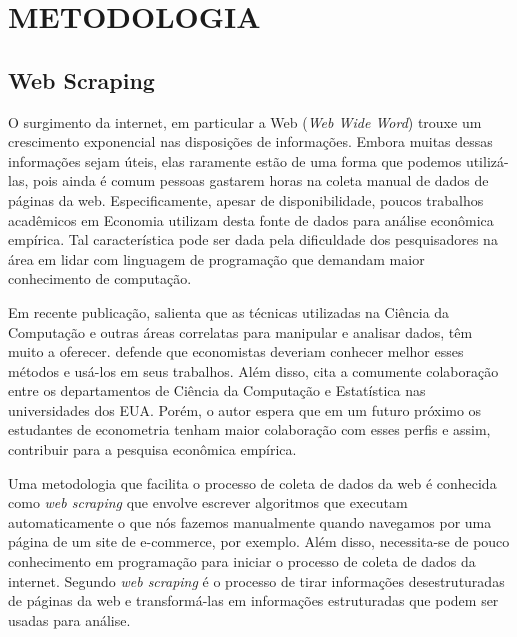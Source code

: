 \pagestyle{empty}
\cleardoublepage
\pagestyle{fancy}

\section{METODOLOGIA}

\subsection{Web Scraping}

O surgimento da internet, em particular a Web (\emph{Web Wide Word}) trouxe um crescimento exponencial nas disposições de informações. Embora muitas dessas informações sejam úteis, elas raramente estão de uma forma que podemos utilizá-las, pois ainda é comum pessoas gastarem horas na coleta manual de dados de páginas da web. Especificamente, apesar de disponibilidade, poucos trabalhos acadêmicos em Economia utilizam desta fonte de dados para análise econômica empírica. Tal característica pode ser dada pela dificuldade dos pesquisadores na área em lidar com linguagem de programação que demandam maior conhecimento de computação. 

Em recente publicação, \citet{varian2014big} salienta que as técnicas utilizadas na Ciência da Computação e outras áreas correlatas para manipular e analisar dados, têm muito a oferecer. \citet{varian2014big} defende que economistas deveriam conhecer melhor esses métodos e usá-los em seus trabalhos. Além disso, \citet{varian2014big} cita a comumente colaboração entre os departamentos de Ciência da Computação e Estatística nas universidades dos EUA. Porém, o autor espera que em um futuro próximo os estudantes de econometria tenham maior colaboração com esses perfis e assim, contribuir para a pesquisa econômica empírica.

Uma metodologia que facilita o processo de coleta de dados da web é conhecida como \emph{web scraping} que envolve escrever algoritmos que executam automaticamente o que nós fazemos manualmente quando navegamos por uma página de um site de e-commerce, por exemplo. Além disso, necessita-se de pouco conhecimento em programação para iniciar o processo de coleta de dados da internet. Segundo \citet{manning2008introduction} \emph{web scraping} é o processo de tirar informações desestruturadas de páginas da web e transformá-las em informações estruturadas que podem ser usadas para análise. 

